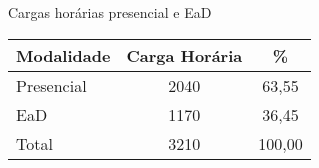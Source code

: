 \begin{quadro}[ht!]
\caption{Cargas horárias presencial e EaD }
\label{quad:ead}
\centering
\begin{tabular}{|l|c|c|}
\hline
\rowcolor{blue1}
 Modalidade &    Carga Horária  & \%\\
\hline
Presencial & 2040 & 63,55 \\
EaD & 1170 & 36,45 \\
\hline
Total  & 3210 & 100,00\\\hline
\end{tabular}
\end{quadro}